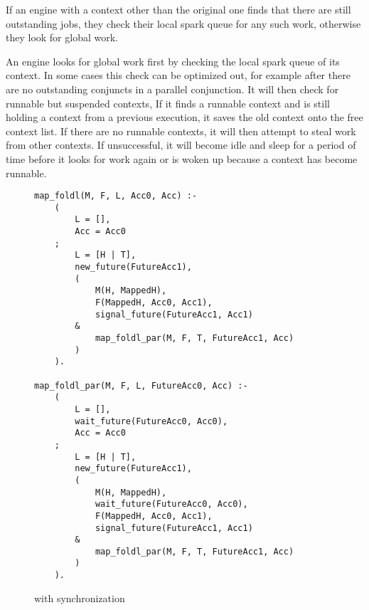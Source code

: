 If an engine with a context other than the original one finds that
there are still outstanding jobs, they check their local spark queue
for any such work, otherwise they look for global work.

An engine looks for global work first by checking the local spark
queue of its context.
In some cases this check can be optimized out, for example after there
are no outstanding conjuncts in a parallel conjunction.
It will then check for runnable but suspended contexts,
If it finds a runnable context and is still holding a context from a
previous execution, it saves the old context onto the free context list.
If there are no runnable contexts,
it will then attempt to steal work from other contexts.
If unsuccessful, it will become idle and sleep for a period of time
before it looks for work again
or is woken up because a context has become runnable.

\begin{figure}
\begin{verbatim}
map_foldl(M, F, L, Acc0, Acc) :-
    (
        L = [],
        Acc = Acc0
    ;
        L = [H | T],
        new_future(FutureAcc1),
        (
            M(H, MappedH),
            F(MappedH, Acc0, Acc1),
            signal_future(FutureAcc1, Acc1)
        &
            map_foldl_par(M, F, T, FutureAcc1, Acc)
        )
    ).

map_foldl_par(M, F, L, FutureAcc0, Acc) :-
    (
        L = [],
        wait_future(FutureAcc0, Acc0),
        Acc = Acc0
    ;
        L = [H | T],
        new_future(FutureAcc1),
        (
            M(H, MappedH),
            wait_future(FutureAcc0, Acc0),
            F(MappedH, Acc0, Acc1),
            signal_future(FutureAcc1, Acc1)
        &
            map_foldl_par(M, F, T, FutureAcc1, Acc)
        )
    ).
\end{verbatim}
\caption{\mapfoldl{} with synchronization}
\label{fig:map_foldl_sync}
\end{figure}

%

